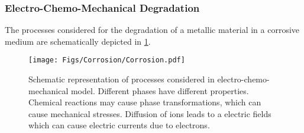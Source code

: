 \subsubsection{Electro-Chemo-Mechanical Degradation}
The processes considered for the degradation of a metallic material in a corrosive medium are schematically depicted in \cref{fig:Corrosion}.
\begin{figure}[h!]
  \centering
  \texttt{[image: Figs/Corrosion/Corrosion.pdf]}
  \caption{Schematic representation of processes considered in electro-chemo-mechanical model. Different phases have different properties. Chemical reactions may cause phase transformations, which can cause mechanical stresses. Diffusion of ions leads to a electric fields which can cause electric currents due to electrons.}
  \label{fig:Corrosion}
\end{figure}

